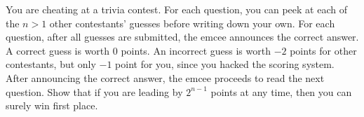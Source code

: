 You are cheating at a trivia contest. For each question, you can peek at each of the $n > 1$ other contestants' guesses before writing down your own. For each question, after all guesses are submitted, the emcee announces the correct answer. A correct guess is worth $0$ points. An incorrect guess is worth $-2$ points for other contestants, but only $-1$ point for you, since you hacked the scoring system. After announcing the correct answer, the emcee proceeds to read the next question. Show that if you are leading by $2^{n - 1}$ points at any time, then you can surely win first place.